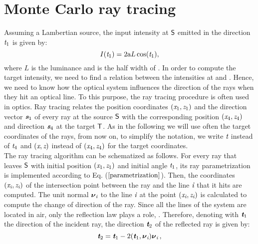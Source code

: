 \section{Monte Carlo ray tracing}
Assuming a Lambertian source, the input intensity at $\textsf{S}$ emitted in the direction $\textit{t}_1$ is given by:
\begin{equation}\label{lambertian_source}
I(\textit{t}_1) = 2\textrm{a}L\cos(\textit{t}_1),
\end{equation}
where $L$ is the luminance and  is the half width of .
In order to compute the target intensity, we need to find a relation between the intensities at  and .
 Hence, we need to know how the optical system influences the direction of the rays when they hit an optical line.
 To this purpose, the ray tracing procedure is often used in optics.
Ray tracing relates the position coordinates
 $ (\textit{x}_1, \textit{z}_1)$ and the direction vector $\textit{\textbf{s}}_1$ of every ray at the source $\textsf{S}$ with the corresponding position $(\textit{x}_4, \textit{z}_4)$ and direction $\textit{\textbf{s}}_4$
 at the target $\textsf{T}$. As in the following we will use often the target coordinates of the rays, from now on, to simplify the notation, we write $\textit{t}$ instead of $\textit{t}_4$ and $(\textit{x}, 
\textit{z})$ instead of $(\textit{x}_4, \textit{z}_4)$ for the target coordinates.\\ \indent The ray tracing algorithm can be schematized as follows.
 For every ray that leaves $\textsf{S}$ with initial position $(\textit{x}_1, \textit{z}_1)$ and initial angle $\textit{t}_1$, its ray parametrization is implemented according to Eq. ($\ref{parametrization}$). 
Then, the coordinates $(\textit{x}_{\textit{i}}, \textit{z}_{\textit{i}})$ of the intersection point between the ray and the line $\textit{i}$ that it hits are computed. The unit normal 
$\boldsymbol{\nu}_{\textit{i}}$ to the line $\textit{i}$ at the point $(\textit{x}_{\textit{i}}, \textit{z}_{\textit{i}})$ is calculated to compute the change of direction of the ray.
 Since all the lines of the system are located in air, only the reflection law plays a role, \cite{Hecht}.
 Therefore, denoting with $\textit{\textbf{t}}_1$ the direction of the incident ray, the direction $\textit{\textbf{t}}_2$ of the reflected ray is given by:
 \begin{equation}\label{reflection}
  \textit{\textbf{t}}_{2} = \textit{\textbf{t}}_1-2(\textit{\textbf{t}}_1,\boldsymbol{\nu}_{\textit{i}})\boldsymbol{\nu}_{\textit{i}}\,,
\end{equation}
